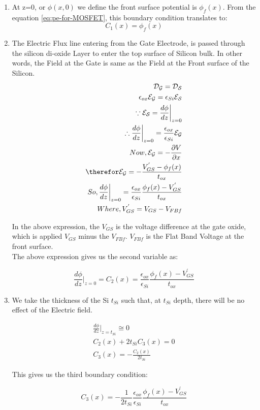 \documentclass[a4paper]{article}
\begin{document}
\begin{enumerate}
\item At z=0, or $\phi(x,0)$ we define the front surface potential is $\phi_f(x)$. From the equation \ref{eq:pe-for-MOSFET}, this boundary condition translates to:
  \begin{equation}
    \label{eq:MOS-b-cond-1}
    C_1(x)=\phi_f(x)
  \end{equation}
\item The Electric Flux line entering from the Gate Electrode, is passed through the silicon di-oxide Layer to enter the top surface of Silicon bulk. In other words, the Field at the Gate is same as the Field at the Front surface of the Silicon.
  \begin{align*}
    \mathcal{D_{G}} = \mathcal{D_{S}}\\
    \epsilon_{ox} \mathcal{E_{G}} = \epsilon_{Si} \mathcal{E_{S}}\\
    \because \mathcal{E_{S}} = \frac{d\phi}{dz} \bigg\vert_{z=0}\\
    \therefore \frac{d\phi}{dz} \bigg\vert_{z=0} = \frac {\epsilon_{ox}} {\epsilon_{Si}} \mathcal{E_{G}}\\
    Now, \mathcal{E_{G}} = - \frac{\partial V}{\partial x}\\
    \therefor \mathcal{E_{G}} = - \frac{V_{GS}^{'} - \phi_f(x)}{t_{ox}}\\
    So, \frac{d\phi}{dz} \bigg\vert_{z=0} = \frac {\epsilon_{ox}} {\epsilon_{Si}} \frac{\phi_f(x) - V_{GS}^{'}}{t_{ox}}\\
    Where, V_{GS}^{'} = V_{GS} - V_{FBf}
  \end{align*}

In the above expression, the $V_{GS}$ is the voltage difference at the gate oxide, which is applied $V_{GS}$ minus the $V_{FBf}$. $V_{FBf}$ is the Flat Band Voltage at the front surface.\\

The above expression gives us the second variable as:

\begin{equation}
  \label{eq:MOS-b-cond-2}
  \frac{d\phi}{dz} \bigg\vert_{z=0} = C_2(x) = \frac {\epsilon_{ox}} {\epsilon_{Si}} \frac{\phi_f(x) - V_{GS}^{'}}{t_{ox}}
\end{equation}

\item We take the thickness of the Si $t_{Si}$ such that, at $t_{Si}$ depth, there will be no effect of the Electric field.

  \begin{align*}
    \frac{d\phi}{dz} \bigg\vert_{z=t_{Si}} \cong 0\\
    C_2(x) + 2t_{Si}C_3(x) = 0\\
    C_3(x) = - \frac{C_2(x)}{2t_{Si}}
  \end{align*}

  This gives us the third boundary condition:

  \begin{equation}
    \label{eq:MOS-b-cond-3}
    C_3(x) = -\frac{1}{2t_{Si}} \frac {\epsilon_{ox}} {\epsilon_{Si}} \frac{\phi_f(x) - V_{GS}^{'}}{t_{ox}}
  \end{equation}
\end{enumerate}
\end{document}
